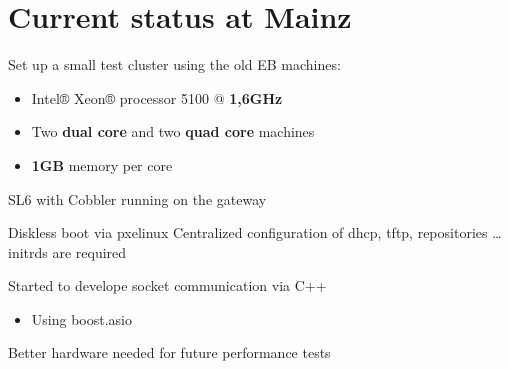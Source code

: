 \section{Current status at Mainz}

\begin{frame}{}{}
	\begin{block}{Set up a small test cluster using the old EB machines:}
    	\centering
    	\begin{itemize}
		  \item Intel® Xeon® processor 5100 @ \textbf{1,6GHz}
		  \item Two \textbf{dual core} and two \textbf{quad core} machines
		  \item \textbf{1GB} memory per core
		\end{itemize}
    \end{block}
    
	\begin{block}{SL6 with Cobbler running on the gateway}
	    \begin{itemize}
			\pro Diskless boot via pxelinux
		  	\pro Centralized configuration of dhcp, tftp, repositories \ldots
		  	\contra initrds are required
		\end{itemize}
    \end{block}
	\begin{block}{Started to develope socket communication via C++}
	    \begin{itemize}
			\item Using boost.asio
		\end{itemize}
    \end{block}
    \begin{ergo}
    	Better hardware needed for future performance tests
    \end{ergo}
\end{frame}